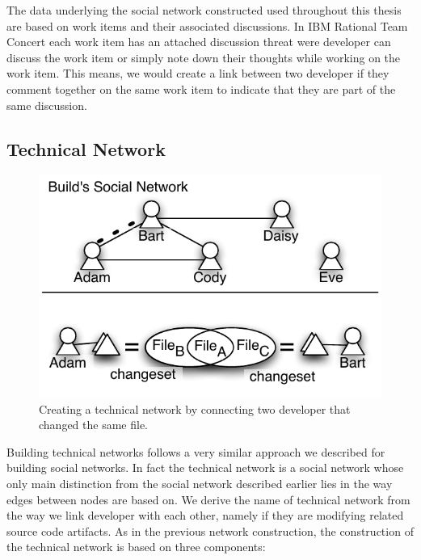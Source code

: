 The data underlying the social network constructed used throughout this thesis are based on work items and their associated discussions.
In IBM Rational Team Concert each work item has an attached discussion threat were developer can discuss the work item or simply note down their thoughts while working on the work item.
This means, we would create a link between two developer if they comment together on the same work item to indicate that they are part of the same discussion.

\subsection{Technical Network}
\begin{figure}[t!]
\centering
\includegraphics[width=.7\textwidth]{figures/addedge}
\caption{Creating a technical network by connecting two developer that changed the same file.}
\label{fig:addtechnicaledge}
\end{figure}

Building technical networks follows a very similar approach we described for building social networks.
In fact the technical network is a social network whose only main distinction from the social network described earlier lies in the way edges between nodes are based on.
We derive the name of technical network from the way we link developer with each other, namely if they are modifying related source code artifacts.
As in the previous network construction, the construction of the technical network is based on three components:

